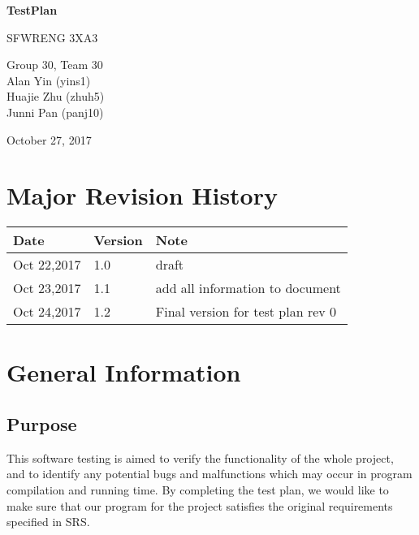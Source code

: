 \documentclass[12pt]{article}
\begin{document}
\begin{titlepage}
    \begin{center}
        \vspace*{1cm}
        
        \Huge
        \textbf{TestPlan}
        
        \vspace{0.5cm}
        \LARGE
        SFWRENG 3XA3
        
        \vspace{1.5cm}
        
\Large
        Group 30, Team 30
		\\ Alan Yin (yins1)
		\\ Huajie Zhu (zhuh5)
		\\ Junni Pan (panj10)
        
        \vspace{1.5cm}
        
        \Large
        October 27, 2017
        
    \end{center}
\end{titlepage}
\newpage
\tableofcontents
\listoftables
\listoffigures


\newpage
\section{Major Revision History}
\begin{table}[h!]
\centering
\begin{tabular}{ | m{10em} | m{1.5cm}| m{5cm}|} 
\hline
Date & Version & Note \\ 
\hline
Oct 22,2017 & 1.0 & draft \\ 
\hline
Oct 23,2017 & 1.1 & add all information to document \\ 
\hline
Oct 24,2017 & 1.2 & Final version for test plan rev 0 \\ 
\hline
\end{tabular}
\end{table}


\section{General Information}
	\subsection{Purpose}
	This software testing is aimed to verify the functionality of the whole project, and to identify any potential bugs and malfunctions which may occur in program compilation and running time. By completing the test plan, we would like to make sure that our program for the project satisfies the original requirements specified in SRS.
\end{document}
